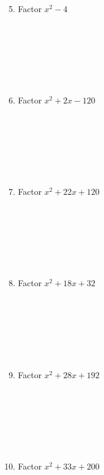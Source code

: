 \documentclass{article}
\begin{document}
\begin{minipage}[t]{0.45\textwidth}
    \begin{enumerate}
        \setcounter{enumi}{4} %
        \item Factor $x^2 - 4$
        \\\\\\\\\\\\\\
        \item Factor $x^2 + 2x - 120$
        \\\\\\\\\\\\\\
        \item Factor $x^2 + 22x + 120$
        \\\\\\\\\\\\\\
        \item Factor $x^2 + 18x + 32$
        \\\\\\\\\\\\\\
        \item Factor $x^2 + 28x + 192$
        \\\\\\\\\\\\\\
        \item Factor $x^2 + 33x + 200$
        

    \end{enumerate}
\end{minipage}
\end{document}
